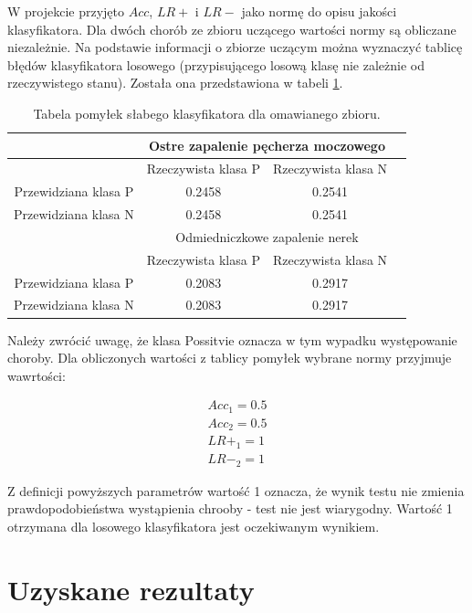 \documentclass[12pt]{article}
\begin{document}
W projekcie przyjęto $Acc$, $LR+$ i $LR-$ jako normę do opisu jakości klasyfikatora. Dla dwóch chorób ze zbioru uczącego wartości normy są obliczane niezależnie. Na podstawie informacji o zbiorze uczącym można wyznaczyć tablicę błędów klasyfikatora losowego (przypisującego losową klasę nie zależnie od rzeczywistego stanu). Została ona przedstawiona w tabeli \ref{conf matrix on traning set}.

\begin{table}
\caption{Tabela pomyłek słabego klasyfikatora dla omawianego zbioru.}
\label{conf matrix on traning set}
\centering
\begin{tabular}{|c|c|c|c|}
  \hline
   & \multicolumn{2}{c}{Ostre zapalenie pęcherza moczowego}  \\
  \hline
   & Rzeczywista klasa P & Rzeczywista klasa N \\
  \hline
  Przewidziana klasa P & 0.2458 & 0.2541 \\
  \hline
  Przewidziana klasa N & 0.2458 & 0.2541 \\
  \hline
  & \multicolumn{2}{c}{Odmiedniczkowe zapalenie nerek} \\
  \hline
  & Rzeczywista klasa P & Rzeczywista klasa N \\
  \hline
  Przewidziana klasa P & 0.2083 & 0.2917 \\
  \hline
  Przewidziana klasa N & 0.2083 & 0.2917 \\
  \hline
\end{tabular}
\end{table}

Należy zwrócić uwagę, że klasa Possitvie oznacza w tym wypadku występowanie choroby. Dla obliczonych wartości  z tablicy pomyłek wybrane normy przyjmuje wawrtości:

\begin{equation}
\begin{aligned}
  Acc_1 = 0.5 \\
  Acc_2 = 0.5 \\
  LR+_1 = 1 \\
  LR-_2 = 1
\end{aligned}
\end{equation}

Z definicji powyższych parametrów wartość 1 oznacza, że wynik testu nie zmienia prawdopodobieństwa wystąpienia chrooby - test nie jest wiarygodny. Wartość 1 otrzymana dla losowego klasyfikatora jest oczekiwanym wynikiem.

\newpage
\section{Uzyskane rezultaty}
\end{document}
